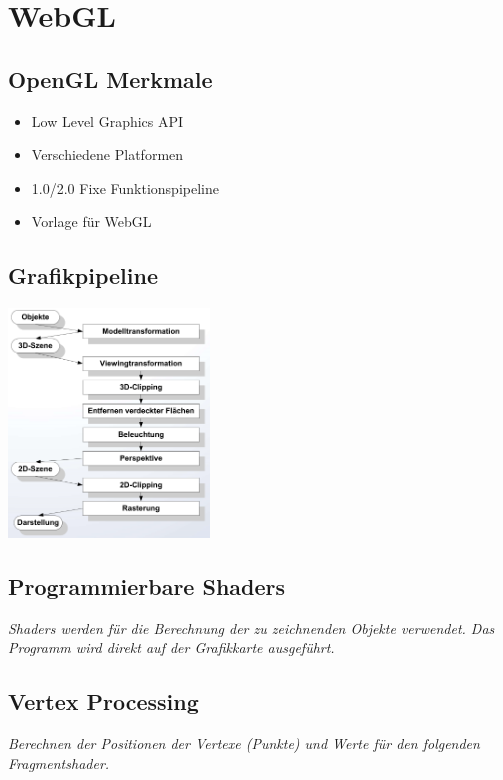 \section{WebGL}

\subsection{OpenGL Merkmale}

\begin{itemize} \setlength\itemsep{0em}
    \item Low Level Graphics API
    \item Verschiedene Platformen
    \item 1.0/2.0 Fixe Funktionspipeline
    \item Vorlage für WebGL
\end{itemize}

\subsection{Grafikpipeline}

\includegraphics[width=0.4\textwidth]{assets/grafikpipline.png}

\subsection{Programmierbare Shaders}

\textit{
    Shaders werden für die Berechnung der zu zeichnenden
    Objekte verwendet. Das Programm wird direkt auf der Grafikkarte
    ausgeführt.
}

\subsection{Vertex Processing}

\textit{
    Berechnen der Positionen der Vertexe (Punkte) und
    Werte für den folgenden Fragmentshader.
}

